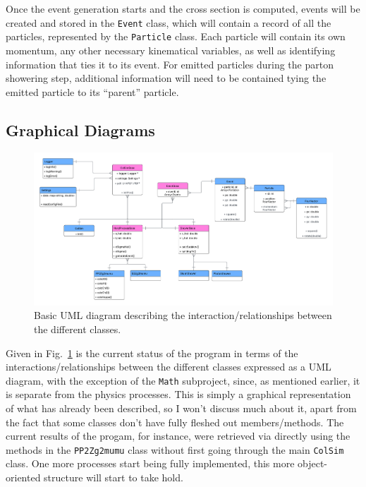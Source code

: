 Once the event generation starts and the cross section is computed, events will be created and stored in the \texttt{Event} class, which will contain a record of all the particles, represented by the \texttt{Particle} class. Each particle will contain its own momentum, any other necessary kinematical variables, as well as identifying information that ties it to its event. For emitted particles during the parton showering step, additional information will need to be contained tying the emitted particle to its ``parent'' particle.


\subsection{Graphical Diagrams}

\begin{figure}[ht]
  \centering
  \includegraphics[width=0.9\linewidth]{./res/Images/ColSim.pdf}
  \caption{Basic UML diagram describing the interaction/relationships between the different classes.}
  \label{fig:uml}
\end{figure}


Given in Fig.~\ref{fig:uml} is the current status of the program in terms of the interactions/relationships between the different classes expressed as a UML diagram, with the exception of the \texttt{Math} subproject, since, as mentioned earlier, it is separate from the physics processes. This is simply a graphical representation of what has already been described, so I won't discuss much about it, apart from the fact that some classes don't have fully fleshed out members/methods. The current results of the progam, for instance, were retrieved via directly using the methods in the \texttt{PP2Zg2mumu} class without first going through the main \texttt{ColSim} class. One more processes start being fully implemented, this more object-oriented structure will start to take hold.



